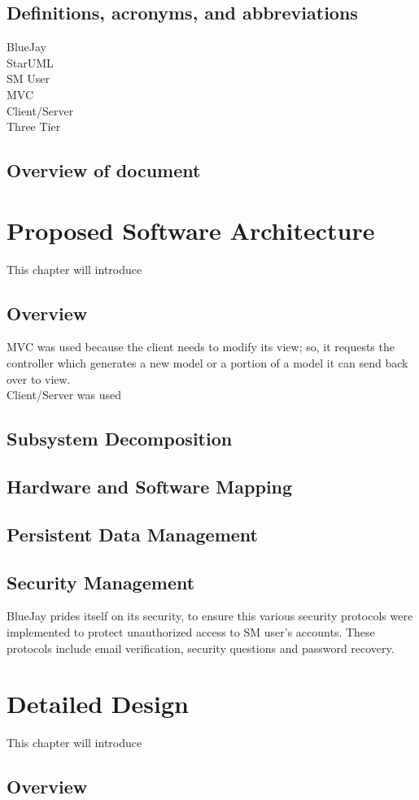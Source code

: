 \documentclass{report}
\begin{document}
\section{Definitions, acronyms, and abbreviations}
BlueJay\\StarUML\\SM User\\MVC\\Client/Server\\Three Tier
\section{Overview of document}
\chapter{Proposed Software Architecture}
	This chapter will introduce 
\section{Overview}
	MVC was used because the client needs to modify its view; so, it requests the controller which generates a new model or a portion of a model it can send back over to view.\\
	Client/Server was used
\section{Subsystem Decomposition}
\section{Hardware and Software Mapping}
\section{Persistent Data Management}
\section{Security Management}
	BlueJay prides itself on its security, to ensure this various security protocols were implemented to protect unauthorized access to SM user’s accounts. These protocols include email verification, security questions and password recovery. 
\chapter{Detailed Design}
	This chapter will introduce 
\section{Overview}
\end{document}
